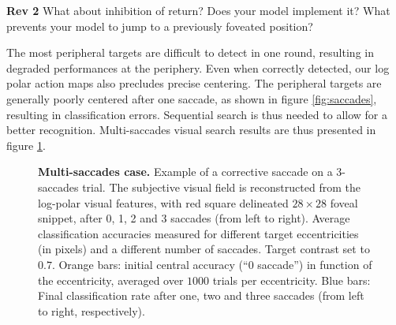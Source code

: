 {\color{red} \textbf{Rev 2} What about inhibition of return? Does your model implement it? What prevents your model to jump to a previously foveated position? }

The most peripheral targets are difficult to detect in one round, resulting in degraded performances at the periphery. Even when correctly detected, our log polar action maps also precludes precise centering. The peripheral targets are generally poorly centered after one saccade, as shown in figure \ref{fig:saccades}, resulting in classification errors. Sequential search is thus needed to allow for a better recognition. Multi-saccades visual search results are thus presented in figure \ref{fig:results-saccades}.


\begin{figure}[t!]%
	\caption{
		{\bf Multi-saccades case.} %
		\A Example of a corrective saccade on a 3-saccades trial. The subjective visual field  is reconstructed from the log-polar visual features, with red square delineated $28\times28$ foveal snippet, after 0, 1, 2 and 3 saccades (from left to right).
		\B Average classification accuracies measured for different target eccentricities (in pixels) and a different number of saccades. Target contrast set to $0.7$. Orange bars: initial central accuracy (``0 saccade'') in function of the eccentricity, averaged over $1000$ trials per eccentricity. Blue bars: Final classification rate after one, two and three saccades (from left to right, respectively).
		\label{fig:results-saccades}}%
\end{figure}%

